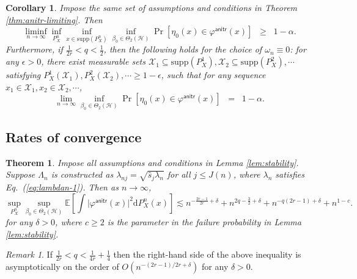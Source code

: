 \documentclass[11pt,a4paper]{article}
\renewcommand{\hat}{\widehat}
\theoremstyle{definition}
\theoremstyle{plain}
\newtheorem{theorem}{Theorem}[section]
\newtheorem{corollary}{Corollary}[section]
\theoremstyle{remark}
\newtheorem{remark}{Remark}[section]
\newcommand{\supp}{\mathrm{supp}}
\newcommand{\mX}{\mathcal X}
\newcommand{\ud}{\mathrm d}
\newcommand{\mH}{\mathcal H}
\newcommand{\anitr}{\mathsf{anitr}}
\begin{document}
\begin{corollary}
Impose the same set of assumptions and conditions in Theorem \ref{thm:anitr-limiting}. Then
$$
\liminf_{n\to\infty}\inf_{P_X^n}\inf_{x\in\supp(P_X^n)}\inf_{\beta_0\in\Theta_2(\mH)}\Pr[\eta_0(x)\in\varphi^\anitr(x)] \;\;\geq\;\; 1-\alpha.
$$
Furthermore, if $\frac{1}{2r}<q<\frac{1}{2}$, then the following holds for the choice of $\omega_n\equiv 0$:
for any $\epsilon>0$, there exist measurable sets $\mX_1\subseteq\supp(P_X^1),\mX_2\subseteq\supp(P_X^2),\cdots$ satisfying $P_X^1(\mX_1),P_X^2(\mX_2),\cdots\geq 1-\epsilon$,
such that for any sequence $x_1\in\mX_1,x_2\in\mX_2,\cdots$, 
$$
\lim_{n\to\infty}\inf_{\beta_0\in\Theta_2(\mH)} \Pr[\eta_0(x)\in\varphi^\anitr(x)] \;\; = \;\; 1-\alpha.
$$
\label{cor:anitr}
\end{corollary}

\subsection{Rates of convergence}

\begin{theorem}
Impose all assumptions and conditions in Lemma \ref{lem:stability}. Suppose $\Lambda_n$ is constructed as $\lambda_{nj}=\sqrt{\hat s_j\lambda_n}$ for all $j\leq J(n)$,
where $\lambda_n$ satisfies Eq.~(\ref{eq:lambdan-1}). Then as $n\to\infty$, 
$$
\sup_{P_X^n}\sup_{\beta_0\in\Theta_2(\mH)}\mathbb E\left[\int \big|\varphi^\anitr(x)\big|^2\ud P_X^n(x) \right] \lesssim n^{-\frac{2r-1}{2r}+\delta} + n^{2q-\frac{3}{2}+\delta} + n^{-q(2r-1)+\delta} + n^{1-c}.
$$
for any $\delta>0$, where $c\geq 2$ is the parameter in the failure probability in Lemma \ref{lem:stability}.
\label{thm:anitr-rates}
\end{theorem}

\begin{remark}
If $\frac{1}{2r}<q<\frac{1}{4r}+\frac{1}{4}$ then the right-hand side of the above inequality is asymptotically on the order of $O(n^{-(2r-1)/2r+\delta})$ for any $\delta>0$.
\end{remark}


\end{document}
